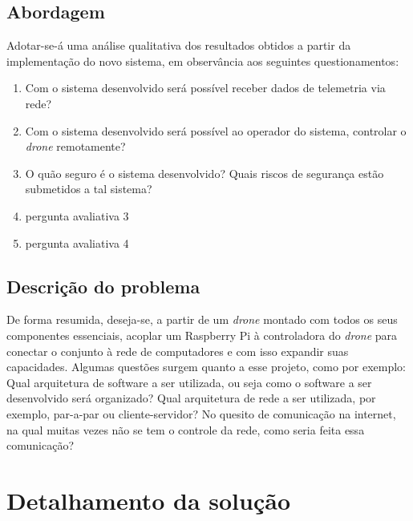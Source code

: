 \documentclass[12pt,a4paper,oneside]{book}
\begin{document}
\section{Abordagem}
Adotar-se-á uma análise qualitativa dos resultados obtidos a partir da implementação do novo sistema, em observância aos seguintes questionamentos:
\begin{enumerate}
    \item Com o sistema desenvolvido será possível receber dados de telemetria via rede?
    \item Com o sistema desenvolvido será possível ao operador do sistema, controlar o \textit{drone} remotamente?
    \item O quão seguro é o sistema desenvolvido? Quais riscos de segurança estão submetidos a tal sistema?
    \item pergunta avaliativa 3
    \item pergunta avaliativa 4
\end{enumerate}
%
%

\section{Descrição do problema}
De forma resumida, deseja-se, a partir de um \textit{drone} montado com todos os seus componentes essenciais, acoplar um Raspberry Pi à controladora do \textit{drone} para conectar o conjunto à rede de computadores e com isso expandir suas capacidades. Algumas questões surgem quanto a esse projeto, como por exemplo: Qual arquitetura de software a ser utilizada, ou seja como o software a ser desenvolvido será organizado? Qual arquitetura de rede a ser utilizada, por exemplo, par-a-par ou cliente-servidor? No quesito de comunicação na internet, na qual muitas vezes não se tem o controle da rede, como seria feita essa comunicação?

%
\chapter{Detalhamento da solução}
%
\thispagestyle{empty} 
%
\end{document}
